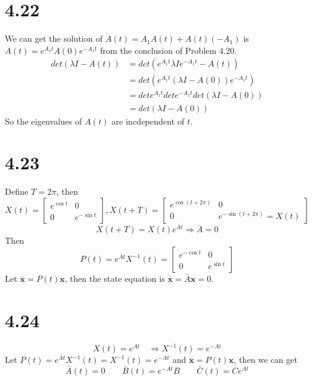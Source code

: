 \documentclass{article}
\begin{document}
\section*{4.22}
We can get the solution of $\dot{A}(t)=A_{1}A(t)+A(t)(-A_{1})$ is $A(t)=e^{A_{1}t}A(0)e^{-A_{1}t}$ from the conclusion of Problem 4.20.\\
$$
\begin{aligned}
det(\lambda I-A(t))&=det(e^{A_{1}t}\lambda Ie^{-A_{1}t}-A(t))\\
&=det(e^{A_{1}t}(\lambda I-A(0))e^{-A_{1}t})\\
&=det e^{A_{1}t} det e^{-A_{1}t} det(\lambda I-A(0))\\
&=det(\lambda I-A(0))
\end{aligned}
$$
So the eigenvalues of $A(t)$ are incdependent of $t$.
\section*{4.23}
Define $T=2\pi$, then
\[X(t)=\left[\begin{array}{cc}e^{\cos t} & 0 \\ 0 & e^{-\sin t}\end{array}\right],
X(t+T)=\left[\begin{array}{cc}e^{\cos (t+2\pi)} & 0 \\ 0 & e^{-\sin (t+2\pi)}=X(t)\end{array}\right]
\]
$$X(t+T)=X(t)e^{\bar{A}t}\Rightarrow \bar{A}=0$$
Then
\[P(t)=e^{\bar{A}t}X^{-1}(t)=\left[\begin{array}{cc}e^{-\cos t} & 0 \\ 0 & e^{\sin t}\end{array}\right]\]
Let $\bar{\pmb{x}}=P(t)\pmb{x}$, then the state equation is
$\dot{\bar{\pmb{x}}}=\bar{A}\pmb{x}=0$.
\section*{4.24}
$$X(t)=e^{At}\quad \Rightarrow X^{-1}(t)=e^{-At}$$
Let $P(t)=e^{\bar{A}t}X^{-1}(t)=X^{-1}(t)=e^{-At}$ and $\bar{\pmb{x}}=P(t)\pmb{x}$, then we can get
$$\bar{A}(t)=0 \quad \quad \bar{B}(t)=e^{-At}B \quad \quad \bar{C}(t)=Ce^{At}$$
\end{document}
